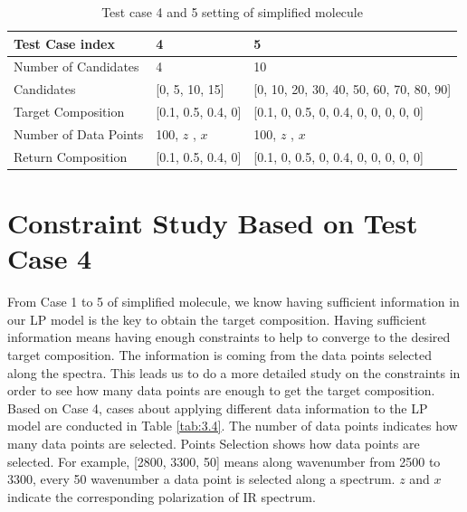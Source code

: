 \begin{table} \small 
\begin{center}
{\def\arraystretch{1.5}
\begin{tabular}{| l | p{3cm} | p{6cm} |}
\hline
Test Case index & 4 & 5\\
\hline
Number of Candidates & 4 & 10 \\
\hline
Candidates & [0, 5, 10, 15] & [0, 10, 20, 30, 40, 50, 60, 70, 80, 90] \\
\hline
Target Composition & [0.1, 0.5, 0.4, 0] & [0.1, 0, 0.5, 0, 0.4, 0, 0, 0, 0, 0]\\
\hline
Number of Data Points & 100, $z$ \newline 100, $x$ & 100, $z$ \newline 100, $x$\\
\hline
Return Composition & [0.1, 0.5, 0.4, 0] & [0.1, 0, 0.5, 0, 0.4, 0, 0, 0, 0, 0] \\
\hline
\end{tabular}
} 
\caption{Test case 4 and 5 setting of simplified molecule}\label{tab:3.3}
\end{center}
\end{table}		

\section{Constraint Study Based on Test Case 4}

From Case 1 to 5 of simplified molecule, we know having sufficient information in our LP model is the key to obtain the target composition. Having sufficient information means having enough constraints to help to converge to the desired target composition. The information is coming from the data points selected along the spectra. This leads us to do a more detailed study on the constraints in order to see how many data points are enough to get the target composition.\\ 

Based on Case 4, cases about applying different data information to the LP model are conducted in Table \ref{tab:3.4}. The number of data points indicates how many data points are selected. Points Selection shows how data points are selected. For example, [2800, 3300, 50] means along wavenumber from 2500 to 3300, every 50 wavenumber a data point is selected along a spectrum. $z$ and $x$ indicate the corresponding polarization of IR spectrum. \\

